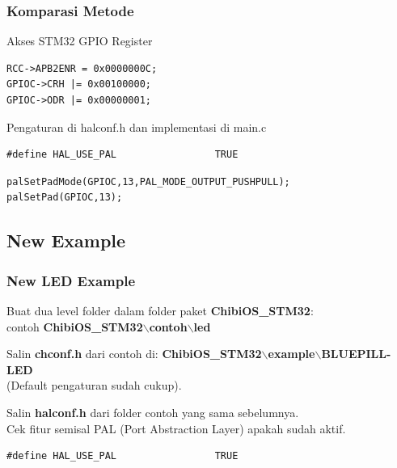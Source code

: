 \documentclass[table,dvipsnames]{beamer}
\begin{document}
	\begin{frame}[fragile]
		\frametitle{Komparasi Metode}
		\begin{exampleblock}{}
			Akses STM32 GPIO Register
			\begin{verbatim}
RCC->APB2ENR = 0x0000000C;
GPIOC->CRH |= 0x00100000;
GPIOC->ODR |= 0x00000001;
			\end{verbatim}
		\end{exampleblock}

		\begin{exampleblock}{}
			Pengaturan di halconf.h dan implementasi di main.c
			\begin{exampleblock}{}
				\begin{verbatim}
#define HAL_USE_PAL                 TRUE
				\end{verbatim}
			\end{exampleblock}

			\begin{exampleblock}{}
				\begin{verbatim}
palSetPadMode(GPIOC,13,PAL_MODE_OUTPUT_PUSHPULL);
palSetPad(GPIOC,13);
				\end{verbatim}
			\end{exampleblock}
		\end{exampleblock}
	\end{frame}

	\subsection{New Example}
	\begin{frame}[fragile]
		\frametitle{New LED Example}
		\begin{exampleblock}{}
			Buat dua level folder dalam folder paket \textbf{ChibiOS\_STM32}:\\
			contoh \textbf{ChibiOS\_STM32$\backslash$contoh$\backslash$led}
		\end{exampleblock}

		\begin{exampleblock}{}
			Salin \textbf{chconf.h} dari contoh di:
			\textbf{ChibiOS\_STM32$\backslash$example$\backslash$BLUEPILL-LED}\\
			(Default pengaturan sudah cukup).
		\end{exampleblock}

		\begin{exampleblock}{}
			Salin \textbf{halconf.h} dari folder contoh yang sama sebelumnya.\\
			Cek fitur semisal PAL (Port Abstraction Layer) apakah sudah aktif.
			\begin{verbatim}
#define HAL_USE_PAL                 TRUE
			\end{verbatim}
		\end{exampleblock}
	\end{frame}
\end{document}
